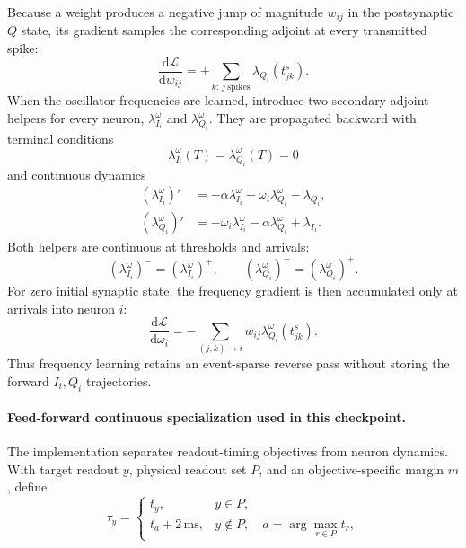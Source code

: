Because a weight produces a negative jump of magnitude $w_{ij}$ in the
postsynaptic $Q$ state, its
gradient samples the corresponding adjoint at every transmitted spike:
\begin{equation}
    \frac{\mathrm d\mathcal L}{\mathrm d w_{ij}}
      =+\sum_{k:\,j\ \mathrm{spikes}}
        \lambda_{Q_i}\!\left(t^s_{jk}\right).
    \label{eq:tes-weight-gradient}
\end{equation}
When the oscillator frequencies are learned, introduce two secondary adjoint
helpers for every neuron, $\lambda_{I_i}^{\omega}$ and
$\lambda_{Q_i}^{\omega}$. They are propagated backward with terminal
conditions
\begin{equation}
    \lambda_{I_i}^{\omega}(T)
      =\lambda_{Q_i}^{\omega}(T)=0
\end{equation}
and continuous dynamics
\begin{align}
    (\lambda_{I_i}^{\omega})'
      &=-\alpha\lambda_{I_i}^{\omega}
        +\omega_i\lambda_{Q_i}^{\omega}
        -\lambda_{Q_i},
        \label{eq:tes-omega-helper-i}\\
    (\lambda_{Q_i}^{\omega})'
      &=-\omega_i\lambda_{I_i}^{\omega}
        -\alpha\lambda_{Q_i}^{\omega}
        +\lambda_{I_i}.
        \label{eq:tes-omega-helper-q}
\end{align}
Both helpers are continuous at thresholds and arrivals:
\begin{equation}
    (\lambda_{I_i}^{\omega})^-
      =(\lambda_{I_i}^{\omega})^+,
    \qquad
    (\lambda_{Q_i}^{\omega})^-
      =(\lambda_{Q_i}^{\omega})^+.
    \label{eq:tes-omega-helper-continuity}
\end{equation}
For zero initial synaptic state, the frequency gradient is then accumulated
only at arrivals into neuron $i$:
\begin{equation}
    \frac{\mathrm d\mathcal L}{\mathrm d\omega_i}
      =-\sum_{(j,k)\to i}
        w_{ij}\lambda_{Q_i}^{\omega}(t^s_{jk}).
    \label{eq:tes-omega-gradient}
\end{equation}
Thus frequency learning retains an event-sparse reverse pass without storing
the forward $I_i,Q_i$ trajectories.

\paragraph{Feed-forward continuous specialization used in this checkpoint.}
The implementation separates readout-timing objectives from neuron dynamics.
With target readout $y$, physical readout set $P$, and an objective-specific
margin $m$, define
\begin{equation}
    \tau_y=
    \begin{cases}
        t_y,&y\in P,\\
        t_a+2\,\mathrm{ms},&y\notin P,\quad
        a=\arg\max_{r\in P}t_r,
    \end{cases}
\end{equation}

